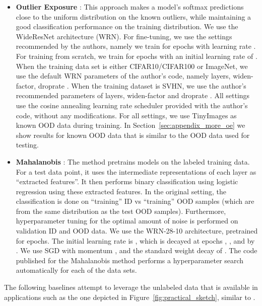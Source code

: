\begin{itemize}
  \item \textbf{Outlier Exposure} \citep{outlier_exposure}: This approach makes
    a model's softmax predictions close to the uniform distribution on the known
    outliers, while maintaining a good classification performance on the
    training distribution. We use the WideResNet architecture (WRN). For
    fine-tuning, we use the settings recommended by the authors, namely we train
    for  epochs with learning rate . For training from scratch, we
    train for  epochs with an initial learning rate of .  When the
    training data set is either CIFAR10/CIFAR100 or ImageNet, we use the default
    WRN parameters of the author's code, namely  layers,  widen-factor,
    droprate .  When the training dataset is SVHN, we use the author's
    recommended parameters of  layers,  widen-factor and droprate .
    All settings use the cosine annealing learning rate scheduler provided with
    the author's code, without any modifications. For all settings, we use
    TinyImages as known OOD data during training. In
    Section~\ref{sec:appendix_more_oe} we show results for known OOD data that
    is similar to the OOD data used for testing.

  \item \textbf{Mahalanobis} \citep{mahalanobis}: The method pretrains models on
    the labeled training data. For a test data point, it uses the intermediate
    representations of each layer as ``extracted features''. It then performs
    binary classification using logistic regression using these extracted
    features. In the original setting, the classification is done on
    ``training'' ID vs ``training'' OOD samples (which are from the same
    distribution as the test OOD samples).  Furthermore, hyperparameter tuning
    for the optimal amount of noise is performed on validation ID and OOD data.
    We use the WRN-28-10 architecture, pretrained for  epochs.  The initial
    learning rate is , which is decayed at epochs , , and  by
    . We use SGD with momentum , and the standard weight decay of . The code published for the Mahalanobis method performs a
    hyperparameter search automatically for each of the data sets. 

\end{itemize}

The following baselines attempt to leverage the unlabeled data that is available
in applications such as the one depicted in Figure~\ref{fig:practical_sketch},
similar to . 

